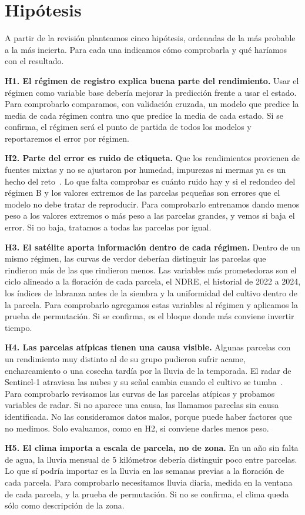 \section{Hipótesis}\label{sec:hipotesis}
A partir de la revisión planteamos cinco hipótesis, ordenadas de la más probable a la más incierta. Para cada una
indicamos cómo comprobarla y qué haríamos con el resultado.

\textbf{H1. El régimen de registro explica buena parte del rendimiento.} Usar el régimen como variable base debería
mejorar la predicción frente a usar el estado. Para comprobarlo comparamos, con validación cruzada, un modelo que
predice la media de cada régimen contra uno que predice la media de cada estado. Si se confirma, el régimen será el
punto de partida de todos los modelos y reportaremos el error por régimen.

\textbf{H2. Parte del error es ruido de etiqueta.} Que los rendimientos provienen de fuentes mixtas y no se ajustaron por humedad, impurezas ni mermas ya es un hecho del reto~\cite{preguntas}. Lo que falta comprobar es cuánto ruido hay y si el redondeo del régimen B y los valores extremos de las parcelas pequeñas son errores que el modelo no debe tratar de reproducir. Para comprobarlo entrenamos dando
menos peso a los valores extremos o más peso a las parcelas grandes, y vemos si baja el error. Si no baja, tratamos a
todas las parcelas por igual.

\textbf{H3. El satélite aporta información dentro de cada régimen.} Dentro de un mismo régimen, las curvas de verdor
deberían distinguir las parcelas que rindieron más de las que rindieron menos. Las variables más prometedoras son el
ciclo alineado a la floración de cada parcela, el NDRE, el historial de 2022 a 2024, los índices de labranza antes de
la siembra y la uniformidad del cultivo dentro de la parcela. Para comprobarlo agregamos estas variables al régimen y
aplicamos la prueba de permutación. Si se confirma, es el bloque donde más conviene invertir tiempo.

\textbf{H4. Las parcelas atípicas tienen una causa visible.} Algunas parcelas con un rendimiento muy distinto al de su
grupo pudieron sufrir acame, encharcamiento o una cosecha tardía por la lluvia de la temporada. El radar de Sentinel-1
atraviesa las nubes y su señal cambia cuando el cultivo se tumba~\cite{chauhan2020}. Para comprobarlo revisamos las
curvas de las parcelas atípicas y probamos variables de radar. Si no aparece una causa, las llamamos parcelas sin causa identificada. No las consideramos datos malos, porque puede haber factores que no medimos. Solo evaluamos, como en H2, si conviene darles menos peso.

\textbf{H5. El clima importa a escala de parcela, no de zona.} En un año sin falta de agua, la lluvia mensual de
5 kilómetros debería distinguir poco entre parcelas. Lo que sí podría importar es la lluvia en las semanas previas a
la floración de cada parcela. Para comprobarlo necesitamos lluvia diaria, medida en la ventana de cada parcela, y
la prueba de permutación. Si no se confirma, el clima queda sólo como descripción de la zona.
